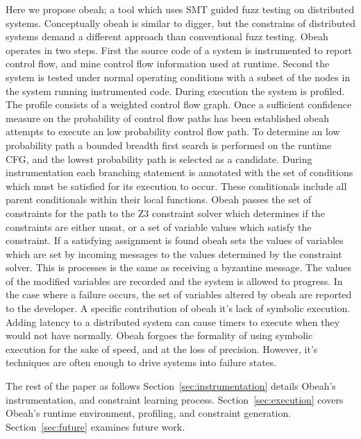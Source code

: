 Here we propose obeah; a tool which uses SMT guided fuzz testing on distributed
systems. Conceptually obeah is similar to digger, but the constrains of
distributed systems demand a different approach than conventional fuzz testing.
Obeah operates in two steps. First the source code of a system is instrumented
to report control flow, and mine control flow information used at runtime.
Second the system is tested under normal operating conditions with a subset of
the nodes in the system running instrumented code. During execution the system
is profiled. The profile consists of a weighted control flow graph. Once a
sufficient confidence measure on the probability of control flow paths has been
established obeah attempts to execute an low probability control flow path. To
determine an low probability path a bounded breadth first search is performed on the
runtime CFG, and the lowest probability path is selected as a candidate. During
instrumentation each branching statement is annotated with the set of
conditions which must be satisfied for its execution to occur. These
conditionals include all parent conditionals within their local functions.
Obeah passes the set of constraints for the path to the Z3 constraint solver
which determines if the constraints are either unsat, or a set of variable
values which satisfy the constraint. If a satisfying assignment is found obeah
sets the values of variables which are set by incoming messages to the values
determined by the constraint solver. This is processes is the same as receiving
a byzantine message. The values of the modified variables are recorded and the
system is allowed to progress. In the case where a failure occurs, the set of
variables altered by obeah are reported to the developer. A specific
contribution of obeah it's lack of symbolic execution. Adding latency to a
distributed system can cause timers to execute when they would not have
normally. Obeah forgoes the formality of using symbolic execution for the sake
of speed, and at the loss of precision. However, it's techniques are often
enough to drive systems into failure states.


The rest of the paper as follows Section~\ref{sec:instrumentation} details
Obeah's instrumentation, and constraint learning process.
Section~\ref{sec:execution} covers Obeah's runtime environment, profiling, and
constraint generation. Section~\ref{sec:future} examines future work.


